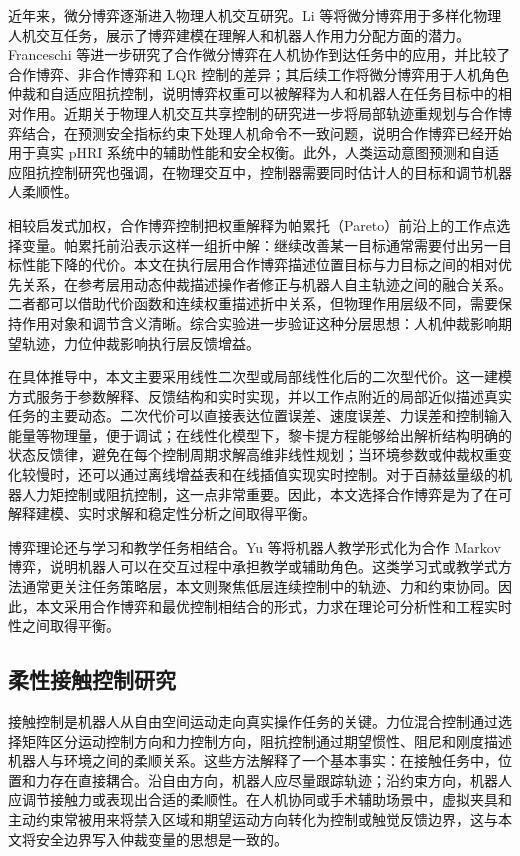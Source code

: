 近年来，微分博弈逐渐进入物理人机交互研究。Li 等将微分博弈用于多样化物理人机交互任务，展示了博弈建模在理解人和机器人作用力分配方面的潜力\cite{li2019differential}。Franceschi 等进一步研究了合作微分博弈在人机协作到达任务中的应用，并比较了合作博弈、非合作博弈和 LQR 控制的差异；其后续工作将微分博弈用于人机角色仲裁和自适应阻抗控制，说明博弈权重可以被解释为人和机器人在任务目标中的相对作用\cite{franceschi2022adaptive,franceschi2023role,franceschi2023modeling}。近期关于物理人机交互共享控制的研究进一步将局部轨迹重规划与合作博弈结合，在预测安全指标约束下处理人机命令不一致问题，说明合作博弈已经开始用于真实 pHRI 系统中的辅助性能和安全权衡\cite{han2025sharedcontrol}。此外，人类运动意图预测和自适应阻抗控制研究也强调，在物理交互中，控制器需要同时估计人的目标和调节机器人柔顺性\cite{franceschi2023predicting,ferrante2022adaptive}。

相较启发式加权，合作博弈控制把权重解释为帕累托（Pareto）前沿上的工作点选择变量。帕累托前沿表示这样一组折中解：继续改善某一目标通常需要付出另一目标性能下降的代价。本文在执行层用合作博弈描述位置目标与力目标之间的相对优先关系，在参考层用动态仲裁描述操作者修正与机器人自主轨迹之间的融合关系。二者都可以借助代价函数和连续权重描述折中关系，但物理作用层级不同，需要保持作用对象和调节含义清晰。综合实验进一步验证这种分层思想：人机仲裁影响期望轨迹，力位仲裁影响执行层反馈增益。

在具体推导中，本文主要采用线性二次型或局部线性化后的二次型代价。这一建模方式服务于参数解释、反馈结构和实时实现，并以工作点附近的局部近似描述真实任务的主要动态。二次代价可以直接表达位置误差、速度误差、力误差和控制输入能量等物理量，便于调试；在线性化模型下，黎卡提方程能够给出解析结构明确的状态反馈律，避免在每个控制周期求解高维非线性规划；当环境参数或仲裁权重变化较慢时，还可以通过离线增益表和在线插值实现实时控制。对于百赫兹量级的机器人力矩控制或阻抗控制，这一点非常重要。因此，本文选择合作博弈是为了在可解释建模、实时求解和稳定性分析之间取得平衡。


博弈理论还与学习和教学任务相结合。Yu 等将机器人教学形式化为合作 Markov 博弈，说明机器人可以在交互过程中承担教学或辅助角色\cite{yu2023coach}。这类学习式或教学式方法通常更关注任务策略层，本文则聚焦低层连续控制中的轨迹、力和约束协同。因此，本文采用合作博弈和最优控制相结合的形式，力求在理论可分析性和工程实时性之间取得平衡。

\subsection{柔性接触控制研究}
\label{subsec:ch1_force_position}

接触控制是机器人从自由空间运动走向真实操作任务的关键。力位混合控制通过选择矩阵区分运动控制方向和力控制方向，阻抗控制通过期望惯性、阻尼和刚度描述机器人与环境之间的柔顺关系\cite{raibert1981hybrid,hogan1985impedance}。这些方法解释了一个基本事实：在接触任务中，位置和力存在直接耦合。沿自由方向，机器人应尽量跟踪轨迹；沿约束方向，机器人应调节接触力或表现出合适的柔顺性。在人机协同或手术辅助场景中，虚拟夹具和主动约束常被用来将禁入区域和期望运动方向转化为控制或触觉反馈边界\cite{bowyer2014virtualfixtures,marinho2019dynamicactive}，这与本文将安全边界写入仲裁变量的思想是一致的。

